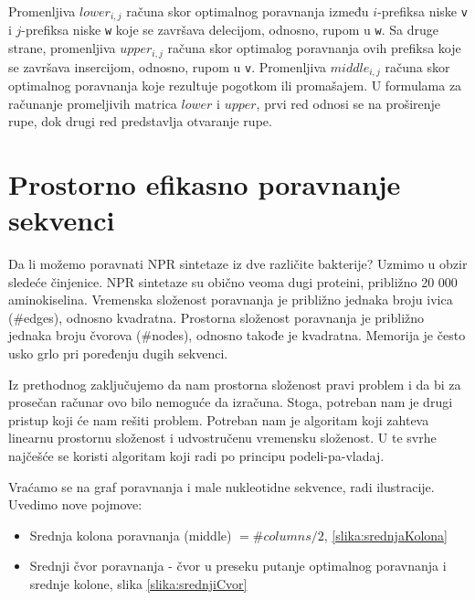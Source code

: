 Promenljiva $lower_{i, j}$ računa skor optimalnog poravnanja između $i$-prefiksa niske \texttt{v} i $j$-prefiksa niske \texttt{w} koje se završava delecijom, odnosno, rupom u \texttt{w}. Sa druge strane, promenljiva $upper_{i, j}$ računa skor optimalog poravnanja ovih prefiksa koje se završava insercijom, odnosno, rupom u \texttt{v}. Promenljiva $middle_{i, j}$ računa skor optimalnog poravnanja koje rezultuje pogotkom ili promašajem. U formulama za računanje promeljivih matrica $lower$ i $upper$, prvi red odnosi se na proširenje rupe, dok drugi red predstavlja otvaranje rupe.


\section{Prostorno efikasno poravnanje sekvenci}

Da li možemo poravnati NPR sintetaze iz dve različite bakterije? Uzmimo u obzir sledeće činjenice. NPR sintetaze su obično veoma dugi proteini, približno 20 000 aminokiselina. Vremenska složenost poravnanja je približno jednaka broju ivica (\#edges), odnosno kvadratna. Prostorna složenost poravnanja je približno jednaka broju čvorova (\#nodes), odnosno takođe je kvadratna. Memorija je često usko grlo pri poređenju dugih sekvenci.

Iz prethodnog zaključujemo da nam prostorna složenost pravi problem i da bi za prosečan računar ovo bilo nemoguće da izračuna.  Stoga, potreban nam je drugi pristup koji će nam rešiti problem. Potreban nam je algoritam koji zahteva linearnu prostornu složenost i udvostručenu vremensku složenost. U te svrhe najčešće se koristi algoritam koji radi po principu podeli-pa-vladaj. 


Vraćamo se na graf poravnanja i male nukleotidne sekvence, radi ilustracije. Uvedimo nove pojmove:
\begin{itemize}
    \item Srednja kolona poravnanja (middle) $= \#columns/2$, \ref{slika:srednjaKolona}
    \item Srednji čvor poravnanja - čvor u preseku putanje optimalnog poravnanja i srednje kolone, slika \ref{slika:srednjiCvor}
\end{itemize}

